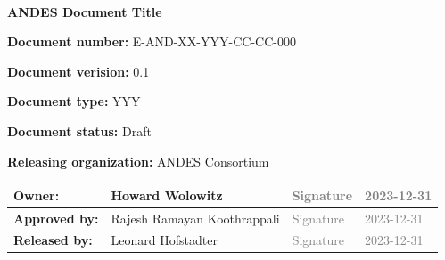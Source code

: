 \documentclass[12pt,a4paper]{article}
\newcommand{\ESOdoctitle}{ANDES Document Title}
\newcommand{\ESOdocnumber}{E-AND-XX-YYY-CC-CC-000}
\newcommand{\ESOdocversion}{0.1}
\newcommand{\ESOdoctype}{YYY}
\newcommand{\ESOdocstatus}{Draft}  %
\newcommand{\ESOdocorganization}{ANDES Consortium}
\begin{document}
\vspace{3cm}

\begin{center}
  \begin{tcolorbox}[colframe=andesbrown, colback=andesgray, width=\textwidth]
    \

    \begin{center}
      {\bf \Large \bigskip \textcolor{andesbrown} \ESOdoctitle{} }
    \end{center}

    \bigskip


    {\bf Document number:} \ESOdocnumber{}

    \medskip

    {\bf Document verision:} \ESOdocversion{}

    \smallskip

    {\bf Document type:} \ESOdoctype{}

    \smallskip

    {\bf Document status:} \ESOdocstatus{}

    \smallskip

    {\bf Releasing organization:} \ESOdocorganization{}

    \bigskip

  \end{tcolorbox}
\end{center}

\vfill

\begin{center}
  \begin{tabularx}{\textwidth}{|l|X|l|l|}
    \hline
    {\bf \small Owner:}       &  Howard Wolowitz               & \textcolor{gray}{Signature} & \textcolor{gray}{2023-12-31} \\[0.8cm] \hline
    {\bf \small Approved by:} &  Rajesh Ramayan Koothrappali   & \textcolor{gray}{Signature} & \textcolor{gray}{2023-12-31} \\[0.8cm] \hline
    {\bf \small Released by:} &  Leonard Hofstadter            & \textcolor{gray}{Signature} & \textcolor{gray}{2023-12-31} \\[0.8cm] \hline
    \end{tabularx}
\end{center}


\restoregeometry



\newpage
\pagestyle{fancy}
\end{document}
